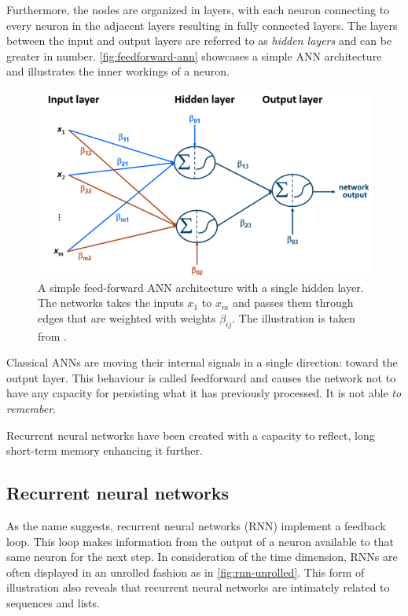 Furthermore, the nodes are organized in layers, with each neuron connecting to every neuron in the adjacent layers resulting in fully connected layers. The layers between the input and output layers are referred to as \textit{hidden layers} and  can be greater in number. \autoref{fig:feedforward-ann} showcases a simple ANN architecture and illustrates the inner workings of a neuron.

\begin{figure}
    \centering
    \includegraphics[width=\textwidth]{gfx/feedforward-neural-network.png}
    \caption{A simple feed-forward ANN architecture with a single hidden layer. The networks takes the inputs $x_1$ to $x_m$ and passes them through edges that are weighted with weights $\beta_{ij}$. The illustration is taken from \cite{lessmannBADS}.}
    \label{fig:feedforward-ann}
\end{figure}

Classical ANNs are moving their internal signals in a single direction: toward the output layer. This behaviour is called feedforward and causes the network not to have any capacity for persisting what it has previously processed. It is not able \textit{to remember}.

Recurrent neural networks have been created with a capacity to reflect, long short-term memory enhancing it further.

\subsection{Recurrent neural networks}
As the name suggests, recurrent neural networks (RNN) implement a feedback loop. This loop makes information from the output of a neuron available to that same neuron for the next step. In consideration of the time dimension, RNNs are often displayed in an unrolled fashion as in \autoref{fig:rnn-unrolled}. This form of illustration also reveals that recurrent neural networks are intimately related to sequences and lists.

